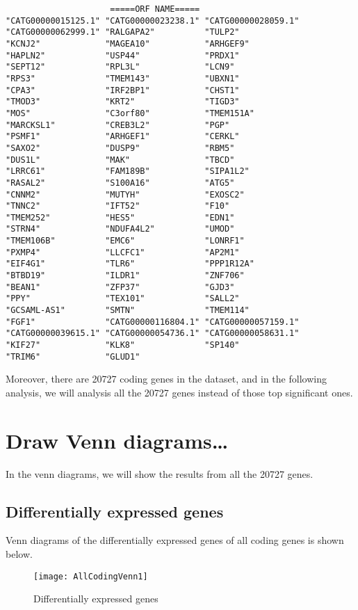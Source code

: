 \documentclass[en,black,12pt,normal]{elegantnote}
\begin{document}
\begin{lstlisting}
                     =====ORF NAME=====
"CATG00000015125.1" "CATG00000023238.1" "CATG00000028059.1" 
"CATG00000062999.1" "RALGAPA2"          "TULP2"            
"KCNJ2"             "MAGEA10"           "ARHGEF9"           
"HAPLN2"            "USP44"             "PRDX1"            
"SEPT12"            "RPL3L"             "LCN9"              
"RPS3"              "TMEM143"           "UBXN1"            
"CPA3"              "IRF2BP1"           "CHST1"             
"TMOD3"             "KRT2"              "TIGD3"            
"MOS"               "C3orf80"           "TMEM151A"          
"MARCKSL1"          "CREB3L2"           "PGP"              
"PSMF1"             "ARHGEF1"           "CERKL"             
"SAXO2"             "DUSP9"             "RBM5"             
"DUS1L"             "MAK"               "TBCD"              
"LRRC61"            "FAM189B"           "SIPA1L2"          
"RASAL2"            "S100A16"           "ATG5"              
"CNNM2"             "MUTYH"             "EXOSC2"           
"TNNC2"             "IFT52"             "F10"               
"TMEM252"           "HES5"              "EDN1"             
"STRN4"             "NDUFA4L2"          "UMOD"              
"TMEM106B"          "EMC6"              "LONRF1"           
"PXMP4"             "LLCFC1"            "AP2M1"             
"EIF4G1"            "TLR6"              "PPP1R12A"         
"BTBD19"            "ILDR1"             "ZNF706"            
"BEAN1"             "ZFP37"             "GJD3"             
"PPY"               "TEX101"            "SALL2"             
"GCSAML-AS1"        "SMTN"              "TMEM114"          
"FGF1"              "CATG00000116804.1" "CATG00000057159.1" 
"CATG00000039615.1" "CATG00000054736.1" "CATG00000058631.1"
"KIF27"             "KLK8"              "SP140"             
"TRIM6"             "GLUD1"            
\end{lstlisting}

Moreover, there are 20727 coding genes in the dataset, and in the following analysis,
we will analysis all the 20727 genes instead of those top significant ones.

\section{Draw Venn diagrams\dots}
In the venn diagrams, we will show the results from all the 20727 genes.


\subsection{Differentially expressed genes}
Venn diagrams of the differentially expressed genes of all coding genes is shown below.
\begin{figure}[H]
    \centering
    \texttt{[image: AllCodingVenn1]}
    \caption{Differentially expressed genes}
    \label{VA}
\end{figure}
\end{document}

